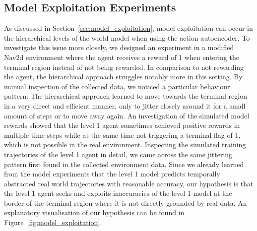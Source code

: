 \documentclass{article}
\begin{document}
\subsection{Model Exploitation Experiments}\label{sec:model_exploitation_experiments}

As discussed in Section~\ref{sec:model_exploitation}, model exploitation can occur in the hierarchical levels of the world model when using the action autoencoder. To investigate this issue more closely, we designed an experiment in a modified Nav2d environment where the agent receives a reward of 1 when entering the terminal region instead of not being rewarded. In comparison to not rewarding the agent, the hierarchical approach struggles notably more in this setting. By manual inspection of the collected data, we noticed a particular behaviour pattern: The hierarchical approach learned to move towards the terminal region in a very direct and efficient manner, only to jitter closely around it for a small amount of steps or to move away again. An investigation of the simulated model rewards showed that the level 1 agent sometimes achieved positive rewards in multiple time steps while at the same time not triggering a terminal flag of 1, which is not possible in the real environment. Inspecting the simulated training trajectories of the level 1 agent in detail, we came across the same jittering pattern first found in the collected environment data. Since we already learned from the model experiments that the level 1 model predicts temporally abstracted real world trajectories with reasonable accuracy, our hypothesis is that the level 1 agent seeks and exploits inaccuracies of the level 1 model at the border of the terminal region where it is not directly grounded by real data. An explanatory visualisation of our hypothesis can be found in Figure~\ref{fig:model_exploitation}.
\end{document}
